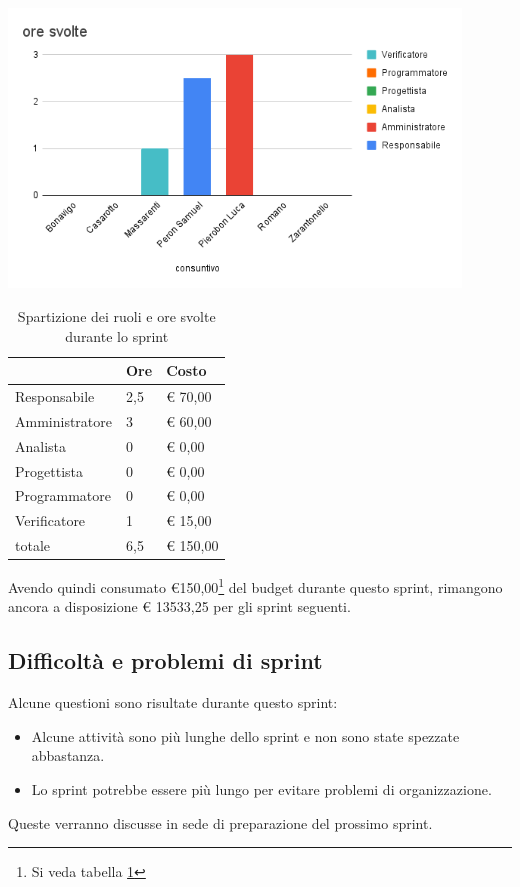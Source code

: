 \begin{center}
\includegraphics[width=12cm]{img/ore-usate.png}
\end{center}

\begin{table}[ht]
    \begin{tabularx}{\linewidth}{X|l|l}
    \rowcolor{gray!30}& Ore & Costo \\
    \hline
    
    Responsabile & 2,5 & € 70,00 \\
    \rowcolor{gray!10}Amministratore & 3 & € 60,00 \\
    Analista & 0 & € 0,00 \\
    \rowcolor{gray!10}Progettista & 0 & € 0,00 \\
    Programmatore & 0 & € 0,00 \\
    \rowcolor{gray!10}Verificatore & 1 &€ 15,00 \\
    totale & 6,5 & € 150,00 \\
    \end{tabularx}
    \caption{\label{costi-ruolo}Spartizione dei ruoli e ore svolte durante lo sprint}
\end{table}


Avendo quindi consumato €150,00\footnote{Si veda tabella \ref{costi-ruolo}} del budget durante questo sprint, rimangono ancora a disposizione € 13533,25 per gli sprint seguenti.

\subsection{Difficoltà e problemi di sprint}

Alcune questioni sono risultate durante questo sprint:

\begin{itemize}
    \item Alcune attività sono più lunghe dello sprint e non sono state spezzate abbastanza.
    \item Lo sprint potrebbe essere più lungo per evitare problemi di organizzazione. 
\end{itemize}

Queste verranno discusse in sede di preparazione del prossimo sprint.
